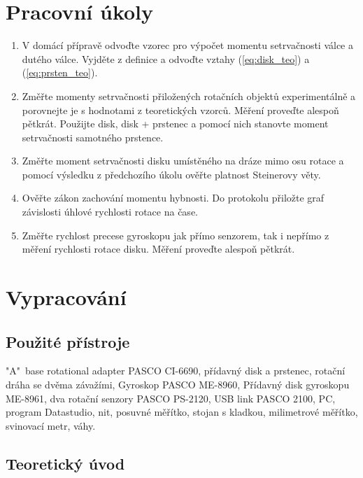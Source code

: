 \documentclass[english]{article}
\begin{document}


\setlength{\parindent}{0.5cm}

\section{Pracovní úkoly}
	\begin{enumerate}
	\item V domácí přípravě odvoďte vzorec pro výpočet momentu setrvačnosti válce a dutého válce. Vyjděte z definice a odvoďte vztahy (\ref{eq:disk_teo}) a (\ref{eq:prsten_teo}).
	\item Změřte momenty setrvačnosti přiložených rotačních objektů experimentálně a porovnejte je s hodnotami z teoretických vzorců. Měření proveďte alespoň pětkrát. Použijte disk, disk + prstenec a pomocí nich stanovte moment setrvačnosti samotného prstence.
	\item Změřte moment setrvačnosti disku umístěného na dráze mimo osu rotace a pomocí výsledku z předchozího úkolu ověřte platnost Steinerovy věty.
	\item Ověřte zákon zachování momentu hybnosti. Do protokolu přiložte graf závislosti úhlové rychlosti rotace na čase.
	\item Změřte rychlost precese gyroskopu jak přímo senzorem, tak i nepřímo z měření rychlosti rotace disku. Měření proveďte alespoň pětkrát.
	\end{enumerate}

\section{Vypracování}

\subsection{Použité přístroje}
	"A"\ base rotational adapter PASCO CI-6690, přídavný disk a prstenec, rotační dráha se dvěma závažími, Gyroskop PASCO ME-8960, Přídavný disk gyroskopu ME-8961, dva rotační senzory PASCO PS-2120, USB link PASCO 2100, PC, program Datastudio, nit, posuvné měřítko, stojan s kladkou, milimetrové měřítko, svinovací metr, váhy.

\subsection{Teoretický úvod}
\end{document}
